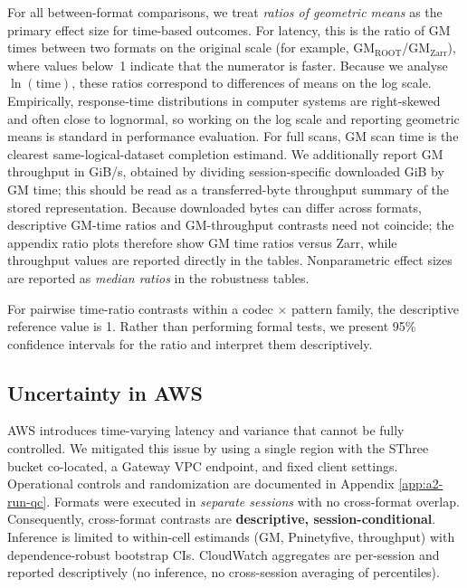 \documentclass[nomenclature, english, bibtex]{kththesis}
\numberwithin{listing}{chapter}
\begin{document}
For all between-format comparisons, we treat \emph{ratios of geometric means} as the primary effect size for time-based outcomes. For latency, this is the ratio of \gls{GM} times between two formats on the original scale (for example, \gls{GM}$_\text{ROOT}$/\gls{GM}$_\text{Zarr}$), where values below~1 indicate that the numerator is faster. Because we analyse $\ln(\text{time})$, these ratios correspond to differences of means on the log scale. Empirically, response‑time distributions in computer systems are right‑skewed and often close to lognormal, so working on the log scale and reporting geometric means is standard in performance evaluation. For full scans, \gls{GM} scan time is the clearest same-logical-dataset completion estimand. We additionally report \gls{GM} throughput in GiB/s, obtained by dividing session-specific downloaded GiB by \gls{GM} time; this should be read as a transferred-byte throughput summary of the stored representation. Because downloaded bytes can differ across formats, descriptive \gls{GM}-time ratios and \gls{GM}-throughput contrasts need not coincide; the appendix ratio plots therefore show \gls{GM} time ratios versus Zarr, while throughput values are reported directly in the tables. Nonparametric effect sizes are reported as \emph{median ratios} in the robustness tables.

For pairwise time-ratio contrasts within a codec $\times$ pattern family, the descriptive reference value is 1. Rather than performing formal tests, we present 95\% confidence intervals for the ratio and interpret them descriptively.

\subsection{\texorpdfstring{Uncertainty in \gls{AWS}}{Uncertainty in AWS}}
\Gls{AWS} introduces time-varying latency and variance that cannot be fully controlled. We mitigated this issue by using a single region with the \gls{SThree} bucket co-located, a Gateway VPC endpoint, and fixed client settings. Operational controls and randomization are documented in Appendix \ref{app:a2-run-qc}. Formats were executed in \emph{separate sessions} with no cross-format overlap. Consequently, cross-format contrasts are \textbf{descriptive, session-conditional}. Inference is limited to within-cell estimands (\gls{GM}, \gls{Pninetyfive}, throughput) with dependence-robust bootstrap \glspl{CI}. CloudWatch aggregates are per-session and reported descriptively (no inference, no cross-session averaging of percentiles).
\end{document}

